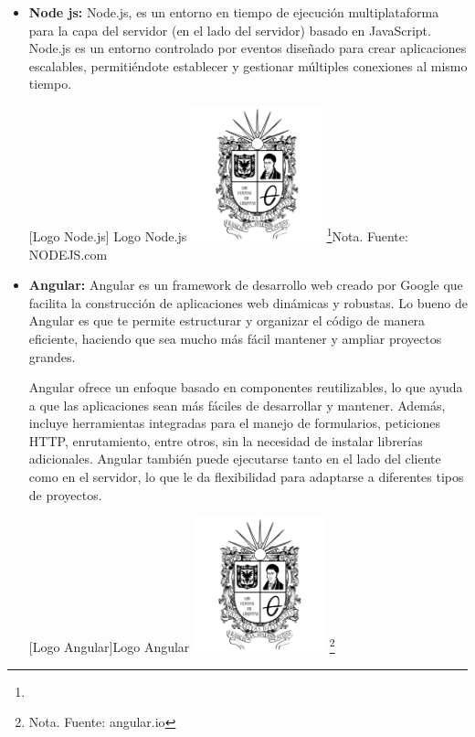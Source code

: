 {\begin{itemize}
    \item \textbf{Node js: }  Node.js, es un entorno en tiempo de ejecución multiplataforma para la capa del servidor (en el lado del servidor) basado en JavaScript. Node.js es un entorno controlado por eventos diseñado para crear aplicaciones escalables, permitiéndote establecer y gestionar múltiples conexiones al mismo tiempo. 
   
    \vspace{2mm}
        \begin{minipage}{0.9\textwidth}
        \centering
        [{Logo Node.js}]{ Logo Node.js  }
        \label{nodeJS}
        \includegraphics[width=0.3\textwidth]{Content/Images/Escudo_UD.png}
        \footnote{}{Nota. \textup{Fuente: NODEJS.com}}
    \end{minipage}
    
      \item \textbf{Angular: } Angular es un framework de desarrollo web creado por Google que facilita la construcción de aplicaciones web dinámicas y robustas. Lo bueno de Angular es que te permite estructurar y organizar el código de manera eficiente, haciendo que sea mucho más fácil mantener y ampliar proyectos grandes.
    
    Angular ofrece un enfoque basado en componentes reutilizables, lo que ayuda a que las aplicaciones sean más fáciles de desarrollar y mantener. Además, incluye herramientas integradas para el manejo de formularios, peticiones HTTP, enrutamiento, entre otros, sin la necesidad de instalar librerías adicionales. Angular también puede ejecutarse tanto en el lado del cliente como en el servidor, lo que le da flexibilidad para adaptarse a diferentes tipos de proyectos.
    
    \vspace{2mm}
        \begin{minipage}{0.9\textwidth}
        \centering
        [{Logo Angular}]{Logo Angular}
        \label{angularLogo}
        \includegraphics[width=0.3\textwidth]{Content/Images/Escudo_UD.png}
        \footnote{Nota. \textup{Fuente: angular.io}}
    \end{minipage}
    

\end{itemize}}
